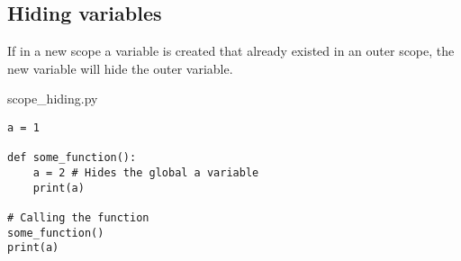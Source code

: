 \documentclass[aspectratio=1610,slidestop]{beamer}
\begin{document}
\begin{pframe}
 \addtocounter{framenumber}{-1}
 \begin{center}
  
 \end{center}
\end{pframe}


\subsection{Hiding variables}
\begin{pframe}
 If in a new scope a variable is created that already existed in an outer scope,
 the new variable will hide the outer variable.
 \pause
 \medskip

 \begin{minipage}[t]{0.60\textwidth}
  \begin{pythonfile}{scope\_hiding.py}
   \begin{verbatim}
a = 1

def some_function():
    a = 2 # Hides the global a variable
    print(a)

# Calling the function
some_function()
print(a)
   \end{verbatim}
  \end{pythonfile}
 \end{minipage}\qquad
 \pause
 \begin{minipage}[t]{0.35\textwidth}
 \vspace{-4.55cm}
 \begin{terminal}
  \end{terminal}
 \end{minipage}
\end{pframe}
\end{document}
